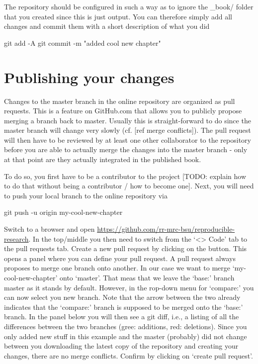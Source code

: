 \documentclass[]{book}
\newenvironment{Shaded}{\begin{snugshade}}{\end{snugshade}}
\newcommand{\StringTok}[1]{\textcolor[rgb]{0.31,0.60,0.02}{#1}}
\newcommand{\FunctionTok}[1]{\textcolor[rgb]{0.00,0.00,0.00}{#1}}
\newcommand{\NormalTok}[1]{#1}
\begin{document}
The repository should be configured in such a way as to ignore the
\_book/ folder that you created since this is just output. You can
therefore simply add all changes and commit them with a short
description of what you did

\begin{Shaded}
\begin{Highlighting}[]
\FunctionTok{git}\NormalTok{ add -A}
\FunctionTok{git}\NormalTok{ commit -m }\StringTok{"added cool new chapter"}
\end{Highlighting}
\end{Shaded}

\section{Publishing your changes}\label{publishing-your-changes}

Changes to the master branch in the online repository are organized as
pull requests. This is a feature on GitHub.com that allows you to
publicly propose merging a branch back to master. Usually this is
straight-forward to do since the master branch will change very slowly
(cf. {[}ref merge conflicts{]}). The pull request will then have to be
reviewed by at least one other collaborator to the repository before you
are able to actually merge the changes into the master branch - only at
that point are they actually integrated in the published book.

To do so, you first have to be a contributor to the project {[}TODO:
explain how to do that without being a contributor / how to become
one{]}. Next, you will need to push your local branch to the online
repository via

\begin{Shaded}
\begin{Highlighting}[]
\FunctionTok{git}\NormalTok{ push -u origin my-cool-new-chapter}
\end{Highlighting}
\end{Shaded}

Switch to a browser and open
\url{https://github.com/rr-mrc-bsu/reproducible-research}. In the
top/middle you then need to switch from the `\textless{}\textgreater{}
Code' tab to the pull requests tab. Create a new pull request by
clicking on the button. This opens a panel where you can define your
pull request. A pull request always proposes to merge one branch onto
another. In our case we want to merge `my-cool-new-chapter' onto
`master'. That meas that we leave the `base:' branch master as it stands
by default. However, in the rop-down menu for `compare:' you can now
select you new branch. Note that the arrow between the two already
indicates that the `compare:' branch is supposed to be merged onto the
`base:' branch. In the panel below you will then see a git diff, i.e., a
listing of all the differences between the two branches (gree:
additions, red: deletions). Since you only added new stuff in this
example and the master (probably) did not change between you downloading
the latest copy of the repository and creating your changes, there are
no merge conflicts. Confirm by clicking on `create pull request'.
\end{document}
